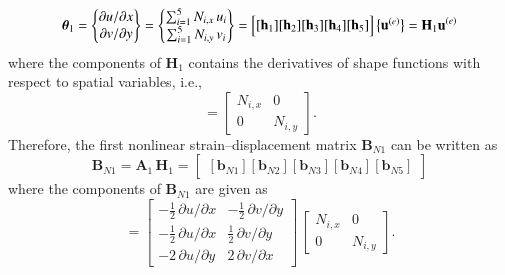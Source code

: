 \small
\begin{equation}
\boldsymbol{\theta}_1 =  \begin{Bmatrix}
\partial u / \partial x\\
\partial v / \partial y
\end{Bmatrix}
= \begin{Bmatrix}
\sum\nolimits_{i=1}^5 N_{i,x} \, u_i\\
\sum\nolimits_{i=1}^5 N_{i,y} \, v_i
\end{Bmatrix} 
= \begin{bmatrix}
[\mathbf{h}_1] [\mathbf{h}_2] [\mathbf{h}_3] [\mathbf{h}_4] [\mathbf{h}_5] 
\end{bmatrix} \bigl\{ \begin{matrix} \mathbf{u}^{(e)} \end{matrix} \bigr\} \\ 
= \mathbf{H}_1  \mathbf{u}^{(e)}
\end{equation}
\normalsize
where the components of $\mathbf{H}_1$ contains the derivatives of shape functions with respect to spatial variables, i.e.,
\begin{equation}
[\mathbf{h}_i] = \begin{bmatrix}
N_{i,x} &  0  \\
0 & N_{i,y}  \end{bmatrix} .
\end{equation}
Therefore, the first nonlinear strain--displacement matrix $\mathbf{B}_{N1}$ can be written as
\begin{equation}
\mathbf{B}_{N1} = \mathbf{A}_1 \, \mathbf{H}_1 = \begin{bmatrix}
[\mathbf{b}_{N1}] [\mathbf{b}_{N2}] [\mathbf{b}_{N3}] [\mathbf{b}_{N4}] [\mathbf{b}_{N5}] 
\end{bmatrix} 
\end{equation}
where the components of $\mathbf{B}_{N1}$ are given as
\begin{equation}
[\mathbf{b}_{Ni}] = \begin{bmatrix}
-\tfrac{1}{2} \, \partial u / \partial x &  - \tfrac{1}{2} \, \partial v / \partial y \\
-\tfrac{1}{2} \, \partial u / \partial x &  \tfrac{1}{2} \, \partial v / \partial y \\
-2 \, \partial u / \partial y  & 2 \, \partial v / \partial x  \end{bmatrix}  \, \begin{bmatrix}
N_{i,x} &  0  \\
0 & N_{i,y}  \end{bmatrix}. 
\end{equation}


